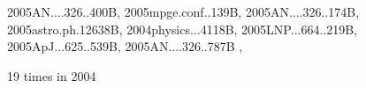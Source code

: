 \documentclass[12pt]{article}
\begin{document}
\begin{description}
{2005AN....326..400B,%
2005mpge.conf..139B,%
2005AN....326..174B,%
2005astro.ph.12638B,%
2004physics...4118B,%
2005LNP...664..219B,%
2005ApJ...625..539B,%
2005AN....326..787B%
},\item
19 times in 2004 \citep{
2004ASPC..325..165N,%
2004A&A...427...13B,%
2004IJAsB...3..209B,%
2004IAUS..219..656D,%
2004A&A...423.1101D,%
2004PhRvE..70b6405H,%
2004PhRvE..70c6408H,%
2004PhRvE..70a6308H,%
2004Ap&SS.292...53H,%
2004MNRAS.353..947H,%
2004PhRvE..69e6303Y,%
2004A&A...417..361J,%
2004DDA....35.0407M,%
2004PhRvE..70e6301P,%
2004PhRvE..69e6407B,%
2004IAUS..223..239D,%
2004AIPC..733..122B,%
}
\end{description}
\end{document}
